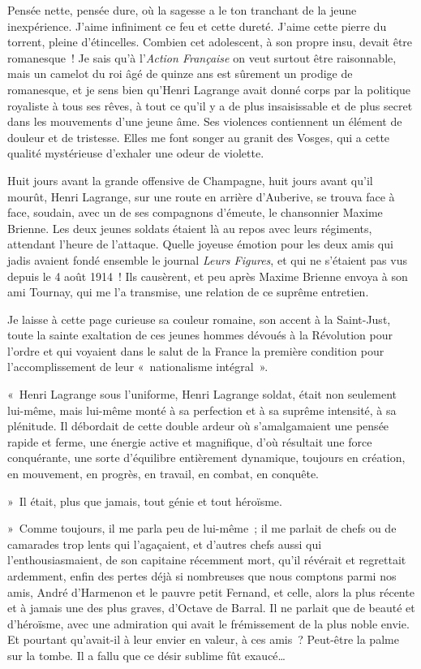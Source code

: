 \documentclass[french,twoside]{book} %
\begin{document}
\noindent Pensée nette, pensée dure, où la sagesse a le ton tranchant de la jeune inexpérience. J’aime infiniment ce feu et cette dureté. J’aime cette pierre du torrent, pleine d’étincelles. Combien cet adolescent, à son propre insu, devait être romanesque ! Je sais qu’à l’{\itshape Action Française} on veut surtout être raisonnable, mais un camelot du roi âgé de quinze ans est sûrement un prodige de romanesque, et je sens bien qu’Henri Lagrange avait donné corps par la politique royaliste à tous ses rêves, à tout ce qu’il y a de plus insaisissable et de plus secret dans les mouvements d’une jeune âme. Ses violences contiennent un élément de douleur et de tristesse. Elles me font songer au granit des Vosges, qui a cette qualité mystérieuse d’exhaler une odeur de violette.‌\par
Huit jours avant la grande offensive de Champagne, huit jours avant qu’il mourût, Henri Lagrange, sur une route en arrière d’Auberive, se trouva face à face, soudain, avec un de ses compagnons d’émeute, le chansonnier Maxime Brienne. Les deux jeunes soldats étaient là au repos avec leurs régiments, attendant l’heure de l’attaque. Quelle joyeuse émotion pour les deux amis qui jadis avaient fondé ensemble le journal {\itshape Leurs Figures}, et qui ne s’étaient pas vus depuis le 4 août 1914 ! Ils causèrent, et peu après Maxime Brienne envoya à son ami Tournay, qui me l’a transmise, une relation de ce suprême entretien.‌\par
Je laisse à cette page curieuse sa couleur romaine, son accent à la Saint-Just, toute la sainte exaltation de ces jeunes hommes dévoués à la Révolution pour l’ordre et qui voyaient dans le salut de la France la première condition pour l’accomplissement de leur « nationalisme intégral ».‌\par
« Henri Lagrange sous l’uniforme, Henri Lagrange soldat, était non seulement lui-même, mais lui-même monté à sa perfection et à sa suprême intensité, à sa plénitude. Il débordait de cette double ardeur où s’amalgamaient une pensée rapide et ferme, une énergie active et magnifique, d’où résultait une force conquérante, une sorte d’équilibre entièrement dynamique, toujours en création, en mouvement, en progrès, en travail, en combat, en conquête.‌\par
» Il était, plus que jamais, tout génie et tout héroïsme.‌\par
» Comme toujours, il me parla peu de lui-même ; il me parlait de chefs ou de camarades trop lents qui l’agaçaient, et d’autres chefs aussi qui l’enthousiasmaient, de son capitaine récemment mort, qu’il révérait et regrettait ardemment, enfin des pertes déjà si nombreuses que nous comptons parmi nos amis, André d’Harmenon et le pauvre petit Fernand, et celle, alors la plus récente et à jamais une des plus graves, d’Octave de Barral. Il ne parlait que de beauté et d’héroïsme, avec une admiration qui avait le frémissement de la plus noble envie. Et pourtant qu’avait-il à leur envier en valeur, à ces amis ? Peut-être la palme sur la tombe. Il a fallu que ce désir sublime fût exaucé…‌\par
\end{document}
